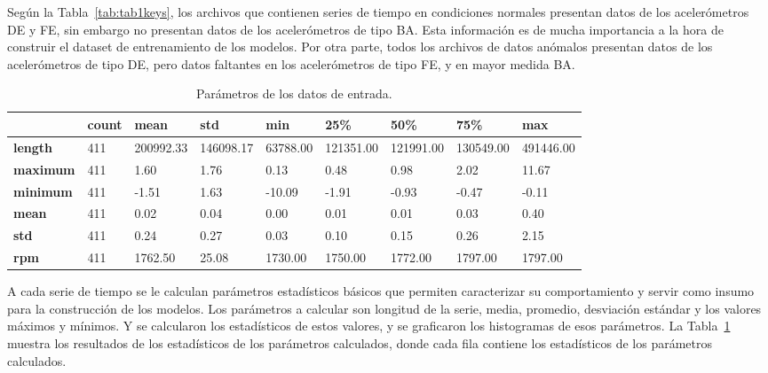 \documentclass[11pt,a4paper,spanish]{book}
\numberwithin{equation}{chapter}
\numberwithin{figure}{chapter}
\begin{document}
Según la Tabla~\ref{tab:tab1keys}, los archivos que contienen series de tiempo en condiciones normales presentan datos de los acelerómetros DE y FE, sin embargo no presentan datos de los acelerómetros de tipo BA. Esta información es de mucha importancia a la hora de construir el dataset de entrenamiento de los modelos. Por otra parte, todos los archivos de datos anómalos presentan datos de los acelerómetros de tipo DE, pero datos faltantes en los acelerómetros de tipo FE, y en mayor medida BA. 


\begin{table}[h]
\centering
\renewcommand{\arraystretch}{1.2}
\footnotesize
\begin{tabularx}{\textwidth}{|l|X|X|X|X|X|X|X|X|}
    \hline
    \textbf{ } & \textbf{count} & \textbf{mean} & \textbf{std} & \textbf{min} & \textbf{25\%} & \textbf{50\%} & \textbf{75\%} & \textbf{max} \\
    \hline
    \textbf{length} & 411 & 200992.33 & 146098.17 & 63788.00 & 121351.00 & 121991.00 & 130549.00 & 491446.00 \\
    \hline
    \textbf{maximum} & 411 & 1.60 & 1.76 & 0.13 & 0.48 & 0.98 & 2.02 & 11.67 \\
    \hline
    \textbf{minimum} & 411 & -1.51 & 1.63 & -10.09 & -1.91 & -0.93 & -0.47 & -0.11 \\
    \hline
    \textbf{mean} & 411 & 0.02 & 0.04 & 0.00 & 0.01 & 0.01 & 0.03 & 0.40 \\
    \hline
    \textbf{std} & 411 & 0.24 & 0.27 & 0.03 & 0.10 & 0.15 & 0.26 & 2.15 \\
    \hline
    \textbf{rpm} & 411 & 1762.50 & 25.08 & 1730.00 & 1750.00 & 1772.00 & 1797.00 & 1797.00 \\
    \hline
\end{tabularx}
\caption{Parámetros de los datos de entrada.}
\label{tab:stats}
\end{table}



A cada serie de tiempo se le calculan parámetros estadísticos básicos que permiten caracterizar su comportamiento y servir como insumo para la construcción de los modelos. Los parámetros a calcular son longitud de la serie, media, promedio, desviación estándar y los valores máximos y mínimos. Y se calcularon los estadísticos de estos valores, y se graficaron los histogramas de esos parámetros. La Tabla~\ref{tab:stats} muestra los resultados de los estadísticos de los parámetros calculados, donde cada fila contiene los estadísticos de los parámetros calculados. 
\end{document}
